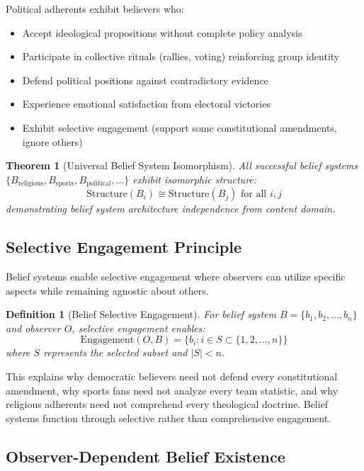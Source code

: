 \documentclass[12pt,a4paper]{article}
\newtheorem{theorem}{Theorem}
\newtheorem{definition}{Definition}
\begin{document}
Political adherents exhibit believers who:
\begin{itemize}
\item Accept ideological propositions without complete policy analysis
\item Participate in collective rituals (rallies, voting) reinforcing group identity
\item Defend political positions against contradictory evidence
\item Experience emotional satisfaction from electoral victories
\item Exhibit selective engagement (support some constitutional amendments, ignore others)
\end{itemize}

\begin{theorem}[Universal Belief System Isomorphism]
All successful belief systems $\{B_{\text{religious}}, B_{\text{sports}}, B_{\text{political}}, ...\}$ exhibit isomorphic structure:
$$\text{Structure}(B_i) \cong \text{Structure}(B_j) \text{ for all } i,j$$
demonstrating belief system architecture independence from content domain.
\end{theorem}

\subsection{Selective Engagement Principle}

Belief systems enable selective engagement where observers can utilize specific aspects while remaining agnostic about others.

\begin{definition}[Belief Selective Engagement]
For belief system $B = \{b_1, b_2, ..., b_n\}$ and observer $O$, selective engagement enables:
$$\text{Engagement}(O, B) = \{b_i : i \in S \subset \{1,2,...,n\}\}$$
where $S$ represents the selected subset and $|S| < n$.
\end{definition}

This explains why democratic believers need not defend every constitutional amendment, why sports fans need not analyze every team statistic, and why religious adherents need not comprehend every theological doctrine. Belief systems function through selective rather than comprehensive engagement.

\subsection{Observer-Dependent Belief Existence}
\end{document}
